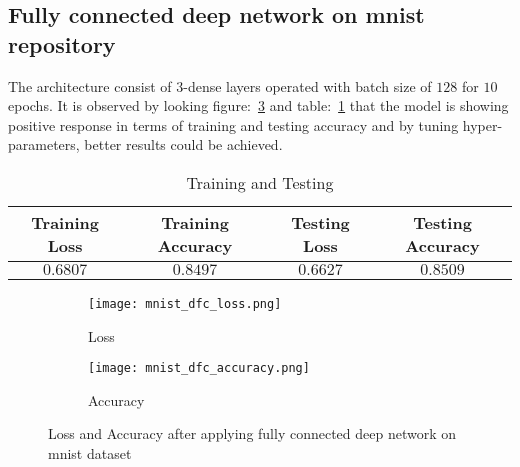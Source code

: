 \documentclass[12pt,a4paper,titlepage]{report}
\begin{document}
\subsection{Fully connected deep network on mnist repository}
The architecture consist of $3$-dense layers operated with batch size of $128$ for $10$ epochs. It is observed by looking figure:~\ref{fig: Image10} and table:~\ref{tab: Table-16} that the model is showing positive response in terms of training and testing accuracy and by tuning hyper-parameters, better results could be achieved.
\vspace{20pt}
\begin{table}[H]
\centering
\caption{Training and Testing}
\label{tab: Table-16}
\begin{tabular}{c c c c}
\hline
\textbf{Training Loss} & \textbf{Training Accuracy} & \textbf{Testing Loss} & \textbf{Testing Accuracy}\\
\hline
$0.6807$ & $0.8497$ & $0.6627$ & $0.8509$\\
\hline
\end{tabular}
\end{table}
\vspace{20pt}

\begin{figure}[H]
\centering
\begin{subfigure}[h]{0.45\linewidth}
\texttt{[image: mnist\_dfc\_loss.png]}
\caption{Loss}
\label{fig:a}
\end{subfigure}
\quad
\begin{subfigure}[h]{0.45\linewidth}
\texttt{[image: mnist\_dfc\_accuracy.png]}
\caption{Accuracy}
\label{fig:b}
\end{subfigure}
\caption{Loss and Accuracy after applying fully connected deep network on mnist dataset}
\label{fig: Image10}
\end{figure}
\end{document}
